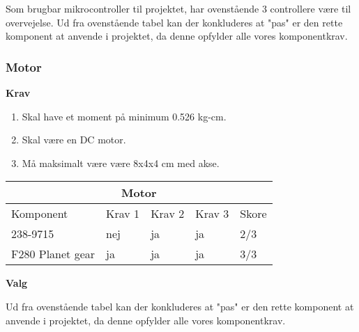Som brugbar mikrocontroller til projektet, har ovenstående 3 controllere være til overvejelse. 
Ud fra ovenstående tabel kan der konkluderes at "pas" er den rette komponent at anvende i projektet, da denne opfylder alle vores komponentkrav.  


\subsubsection{Motor}
\textbf{Krav}
\begin{enumerate}
\item Skal have et moment på minimum 0.526 kg-cm.
\item Skal være en DC motor.
\item Må maksimalt være være 8x4x4 cm med akse.
\end{enumerate}
\begin{center}
\begin{tabular}{|p{2.6cm}||p{1.3cm}|p{1.3cm}|p{1.3cm}|p{1cm}|}
 \hline
 \multicolumn{5}{|c|}{Motor} \\
 \hline
 Komponent & Krav 1 & Krav 2 & Krav 3 & Skore\\
 \hline
  238-9715 & nej & ja & ja & 2/3\\
 F280 Planet gear & ja & ja & ja & 3/3\\
 \hline
\end{tabular}
\end{center}
\textbf{Valg}

Ud fra ovenstående tabel kan der konkluderes at "pas" er den rette komponent at anvende i projektet, da denne opfylder alle vores komponentkrav. 


